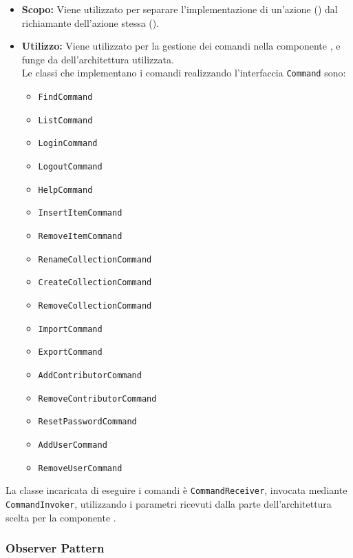 \documentclass{scalatekids-article}
\begin{document}
\begin{itemize}
\item \textbf{Scopo:} Viene utilizzato per separare l'implementazione di un'azione
  () dal richiamante dell'azione stessa ().
\item \textbf{Utilizzo:} Viene utilizzato per la gestione dei comandi nella componente
  , e funge da  dell'architettura  utilizzata.\\
  Le classi che implementano i comandi realizzando l'interfaccia \verb=Command= sono:
  \begin{itemize}
  \item \verb=FindCommand=
  \item \verb=ListCommand=
  \item \verb=LoginCommand=
  \item \verb=LogoutCommand=
  \item \verb=HelpCommand=
  \item \verb=InsertItemCommand=
  \item \verb=RemoveItemCommand=
  \item \verb=RenameCollectionCommand=
  \item \verb=CreateCollectionCommand=
  \item \verb=RemoveCollectionCommand=
  \item \verb=ImportCommand=
  \item \verb=ExportCommand=
  \item \verb=AddContributorCommand=
  \item \verb=RemoveContributorCommand=
  \item \verb=ResetPasswordCommand=
  \item \verb=AddUserCommand=
  \item \verb=RemoveUserCommand=
  \end{itemize}
\end{itemize}

La classe incaricata di eseguire i comandi è \verb=CommandReceiver=, invocata mediante
\verb=CommandInvoker=, utilizzando i parametri ricevuti dalla parte 
dell'architettura  scelta per la componente .

\subsubsection{Observer Pattern}

\label{sec:ObserverPattern}
\end{document}
